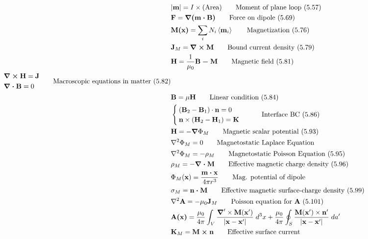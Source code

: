 \documentclass[10pt]{article}
\newcommand{\vect}[1]{\boldsymbol{\mathbf{#1}}}
\newcommand{\ev}[1]{\left\langle #1 \right\rangle}
\begin{document}
\begin{multicols}{2}
\begin{align*}
		& |\vect{m}| = I \times (\text{Area}) \tag*{Moment of plane loop (5.57)} \\
		& \vect{F} = \vect{\nabla(m \cdot B)} \tag*{Force on dipole (5.69)} \\
		& \vect{M(x)} = \sum_i N_i \ev{\vect{m}_i} \tag*{Magnetization (5.76)} \\
		& \vect{J}_M = \vect{\nabla \times M} \tag*{Bound current density (5.79)} \\
		& \vect{H} = \frac{1}{\mu_0} \vect{B - M} \tag*{Magnetic field (5.81)} \\
		\begin{split}
			& \vect{\nabla \times H} = \vect{J}\\
			& \vect{\nabla \cdot B} = 0\\
		\end{split} \tag*{Macroscopic equations in matter (5.82)} \\
		& \vect{B} = \mu \vect{H} \tag*{Linear condition (5.84)} \\
		&\begin{cases}
			(\vect{B}_2 - \vect{B}_1) \cdot \vect{n} = 0 \\
			\vect{n} \times (\vect{H}_2 - \vect{H}_1) = \vect{K} \\ 
		\end{cases} \tag*{Interface BC (5.86)} \\
		& \vect{H} = -\vect{\nabla} \Phi_M \tag*{Magnetic scalar potential (5.93)} \\
		& \nabla^2 \Phi_M = 0 \tag*{Magnetostatic Laplace Equation} \\
		& \nabla^2 \Phi_M = - \rho_M \tag*{Magnetostatic Poisson Equation (5.95)} \\
		& \rho_M = - \vect{\nabla \cdot M} \tag*{Effective magnetic charge density (5.96)} \\
		& \Phi_M(\vect{x}) = \frac{\vect{m \cdot x}}{4 \pi r^3} \tag*{Mag. potential of dipole} \\
		& \sigma_M = \vect{n \cdot M} \tag*{Effective magnetic surface-charge density (5.99)} \\
		& \nabla^2 \vect{A} = -\mu_0 \vect{J}_M \tag*{Poisson equation for $\vect{A}$ (5.101)} \\
		& \vect{A(x)} = \frac{\mu_0}{4 \pi} \int_V \frac{\vect{\nabla}' \times \vect{M}(\vect{x}')}{|\vect{x} - \vect{x}'|} \; d^3 x + \frac{\mu_0}{4 \pi} \oint_S \frac{\vect{M}(\vect{x}') \times \vect{n}'}{|\vect{x} - \vect{x}'|} \; da' \notag \\
		& \vect{K}_M = \vect{M \times n} \tag*{Effective surface current} \\

\end{align*}
\end{multicols}
\end{document}
